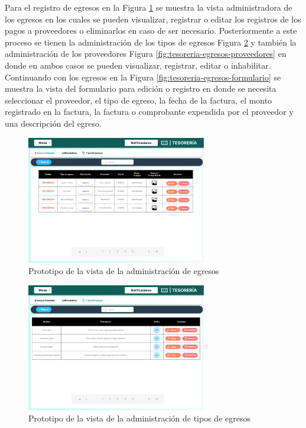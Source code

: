 Para el registro de egresos en la Figura \ref{fig:tesoreria-egresos} se muestra la vista administradora de los egresos en los cuales se pueden visualizar, registrar o editar los registros de los pagos a proveedores o eliminarlos en caso de ser necesario.
Posteriormente a este proceso se tienen la administración de los tipos de egresos Figura \ref{fig:tesoreria-egresos-tipos} y también la administración de los proveedores Figura \ref{fig:tesoreria-egresos-proveedores} en donde en ambos casos se pueden visualizar, registrar, editar o inhabilitar.
Continuando con los egresos en la Figura \ref{fig:tesoreria-egresos-formulario} se muestra la vista del formulario para edición o registro en donde se necesita seleccionar el proveedor, el tipo de egreso, la fecha de la factura, el monto registrado en la factura, la factura o comprobante expendida por el proveedor y una descripción del egreso.

\begin{figure}[H]
    \centering
    \includegraphics[width=0.7\textwidth]{resources/images/tesoreia - egresos - generales}
    \caption{Prototipo de la vista de la administración de egresos}
    \label{fig:tesoreria-egresos}
\end{figure}

\begin{figure}[H]
    \centering
    \includegraphics[width=0.7\textwidth]{resources/images/tesoreia - egresos - tipos}
    \caption{Prototipo de la vista de la administración de tipos de egresos}
    \label{fig:tesoreria-egresos-tipos}
\end{figure}

